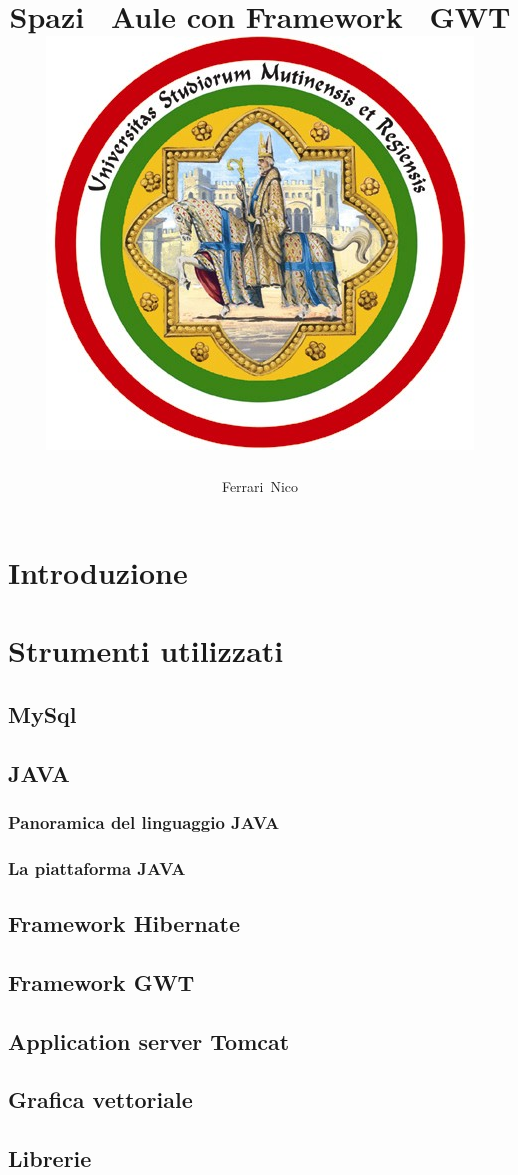 \documentclass[a4paper,pt11,oneside]{book}
\title{
\huge
\textbf{Spazi ~Aule con Framework ~GWT}\\
{\includegraphics[scale=2]{university.jpg}}}
\author{Ferrari~Nico}
\begin{document}
\maketitle
\renewcommand{\contentsname}{Indice}
\tableofcontents
\listoffigures
\listoftables

\chapter{Introduzione}


\chapter{Strumenti utilizzati}
\section{MySql}

\section{JAVA}

\subsection{Panoramica del linguaggio JAVA}

\subsection{La piattaforma JAVA}

\section{Framework Hibernate}

\section{Framework GWT}

\section{Application server Tomcat}

\section{Grafica vettoriale}

\section{Librerie}

\end{document}
